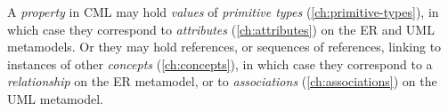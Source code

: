 A \emph{property} in CML may hold \emph{values} of \emph{primitive types} (\ref{ch:primitive-types}),
in which case they correspond to \emph{attributes} (\ref{ch:attributes})
on the ER \cite{er} and UML \cite{uml} metamodels.
Or they may hold references, or sequences of references,
linking to instances of other \emph{concepts} (\ref{ch:concepts}),
in which case they correspond to a \emph{relationship} on the ER metamodel,
or to \emph{associations} (\ref{ch:associations}) on the UML metamodel.
